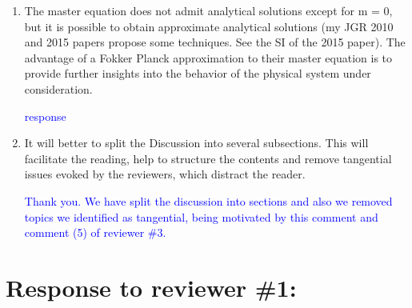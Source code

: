 \documentclass[11pt]{article}
\begin{document}
\begin{enumerate}
\item The master equation does not admit analytical solutions except for m = 0, but it is possible to obtain approximate analytical solutions (my JGR 2010 and 2015 papers propose some techniques. See the SI of the 2015 paper). The advantage of a Fokker Planck approximation to their master equation is to provide further insights into the behavior of the physical system under consideration.

\textcolor{blue}{response}

\item It will better to split the Discussion into several subsections. This will facilitate the reading, help to structure the contents and remove tangential issues evoked by the reviewers, which distract the reader.

\textcolor{blue}{Thank you. We have split the discussion into sections and also we removed topics we identified as tangential, being motivated by this comment and comment (5) of reviewer \#3.}


\end{enumerate}


\section*{Response to reviewer \#1:}
\end{document}

